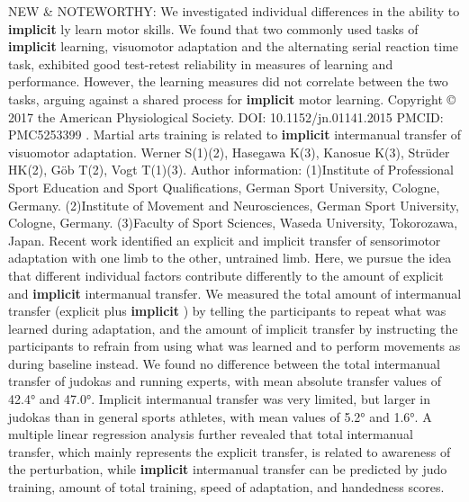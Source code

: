 \documentclass[11pt]{article}
\begin{document}
\newline  [  52  ]   NEW & NOTEWORTHY: We investigated individual differences in the ability to    \textbf {  implicit  }  ly learn motor skills.
\newline  [  53  ]   We found that two commonly used  tasks of   \textbf {  implicit  }   learning, visuomotor adaptation and the alternating serial  reaction time task, exhibited good test-retest reliability in measures of  learning and performance.
\newline  [  54  ]   However, the learning measures did not correlate  between the two tasks, arguing against a shared process for   \textbf {  implicit  }   motor  learning.  Copyright © 2017 the American Physiological Society.  DOI: 10.1152/jn.01141.2015 PMCID: PMC5253399
.  Martial arts training is related to   \textbf {  implicit  }   intermanual transfer of visuomotor  adaptation.  Werner S(1)(2), Hasegawa K(3), Kanosue K(3), Strüder HK(2), Göb T(2), Vogt  T(1)(3).  Author information: (1)Institute of Professional Sport Education and Sport Qualifications, German  Sport University, Cologne, Germany. (2)Institute of Movement and Neurosciences, German Sport University, Cologne,  Germany. (3)Faculty of Sport Sciences, Waseda University, Tokorozawa, Japan.  Recent work identified an explicit and implicit transfer of sensorimotor  adaptation with one limb to the other, untrained limb.
\newline  [  56  ]   Here, we pursue the idea  that different individual factors contribute differently to the amount of  explicit and   \textbf {  implicit  }   intermanual transfer.
\newline  [  57  ]   We measured the total  amount of intermanual transfer (explicit plus   \textbf {  implicit  }  ) by telling the  participants to repeat what was learned during adaptation, and the amount of  implicit transfer by instructing the participants to refrain from using what was  learned and to perform movements as during baseline instead.
\newline  [  58  ]   We found no  difference between the total intermanual transfer of judokas and running  experts, with mean absolute transfer values of 42.4° and 47.0°. Implicit  intermanual transfer was very limited, but larger in judokas than in general  sports athletes, with mean values of 5.2° and 1.6°. A multiple linear regression  analysis further revealed that total intermanual transfer, which mainly  represents the explicit transfer, is related to awareness of the perturbation,  while   \textbf {  implicit  }   intermanual transfer can be predicted by judo training, amount of  total training, speed of adaptation, and handedness scores.
\end{document}
